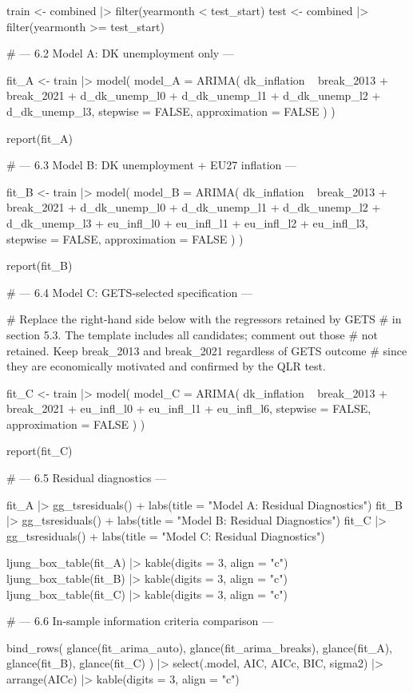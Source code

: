 train <- combined |> filter(yearmonth <  test_start)
test  <- combined |> filter(yearmonth >= test_start)


# --- 6.2 Model A: DK unemployment only ---

fit_A <- train |>
  model(
    model_A = ARIMA(
      dk_inflation ~ break_2013 + break_2021 +
        d_dk_unemp_l0 + d_dk_unemp_l1 + d_dk_unemp_l2 + d_dk_unemp_l3,
      stepwise      = FALSE,
      approximation = FALSE
    )
  )

report(fit_A)


# --- 6.3 Model B: DK unemployment + EU27 inflation ---

fit_B <- train |>
  model(
    model_B = ARIMA(
      dk_inflation ~ break_2013 + break_2021 +
        d_dk_unemp_l0 + d_dk_unemp_l1 + d_dk_unemp_l2 + d_dk_unemp_l3 +
        eu_infl_l0 + eu_infl_l1 + eu_infl_l2 + eu_infl_l3,
      stepwise      = FALSE,
      approximation = FALSE
    )
  )

report(fit_B)


# --- 6.4 Model C: GETS-selected specification ---

# Replace the right-hand side below with the regressors retained by GETS
# in section 5.3. The template includes all candidates; comment out those
# not retained. Keep break_2013 and break_2021 regardless of GETS outcome
# since they are economically motivated and confirmed by the QLR test.

fit_C <- train |>
  model(
    model_C = ARIMA(
      dk_inflation ~ break_2013 + break_2021 +
        eu_infl_l0 + eu_infl_l1 + eu_infl_l6,
      stepwise      = FALSE,
      approximation = FALSE
    )
  )

report(fit_C)


# --- 6.5 Residual diagnostics ---

fit_A |> gg_tsresiduals() + labs(title = "Model A: Residual Diagnostics")
fit_B |> gg_tsresiduals() + labs(title = "Model B: Residual Diagnostics")
fit_C |> gg_tsresiduals() + labs(title = "Model C: Residual Diagnostics")

ljung_box_table(fit_A) |> kable(digits = 3, align = "c")
ljung_box_table(fit_B) |> kable(digits = 3, align = "c")
ljung_box_table(fit_C) |> kable(digits = 3, align = "c")


# --- 6.6 In-sample information criteria comparison ---

bind_rows(
  glance(fit_arima_auto),
  glance(fit_arima_breaks),
  glance(fit_A),
  glance(fit_B),
  glance(fit_C)
) |>
  select(.model, AIC, AICc, BIC, sigma2) |>
  arrange(AICc) |>
  kable(digits = 3, align = "c")


